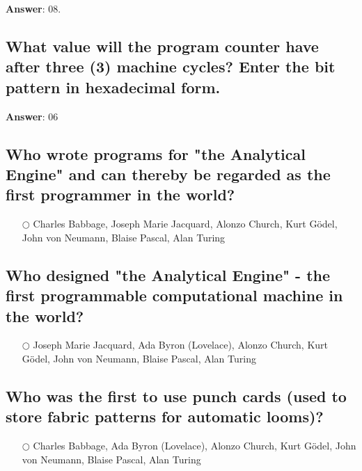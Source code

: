 \documentclass[a4paper,11pt,oneside]{article}
\begin{document}
\begin{sloppypar}
\label{q:432:sa:en:True}

\textbf{Answer}: 08.



\subsection{What value will the program counter have after three (3) machine cycles? Enter the bit pattern in hexadecimal form.}

\label{q:433:sa:en:True}

\textbf{Answer}: 06



\subsection{Who wrote programs for "the Analytical Engine" and can thereby be regarded as the first programmer in the world?}

\label{q:434:mc:en:True}

\begin{itemize}
  \item[$\bigcirc$] Charles Babbage, Joseph Marie Jacquard, Alonzo Church, Kurt G\"odel, John von Neumann, Blaise Pascal, Alan Turing
\end{itemize}



\subsection{Who designed "the Analytical Engine" - the first programmable computational machine in the world?}

\label{q:435:mc:en:True}

\begin{itemize}
  \item[$\bigcirc$] Joseph Marie Jacquard, Ada Byron (Lovelace), Alonzo Church, Kurt G\"odel, John von Neumann, Blaise Pascal, Alan Turing
\end{itemize}



\subsection{Who was the first to use punch cards (used to store fabric patterns for automatic looms)?}

\label{q:436:mc:en:True}

\begin{itemize}
  \item[$\bigcirc$] Charles Babbage, Ada Byron (Lovelace), Alonzo Church, Kurt G\"odel, John von Neumann, Blaise Pascal, Alan Turing
\end{itemize}




\end{sloppypar}
\end{document}
